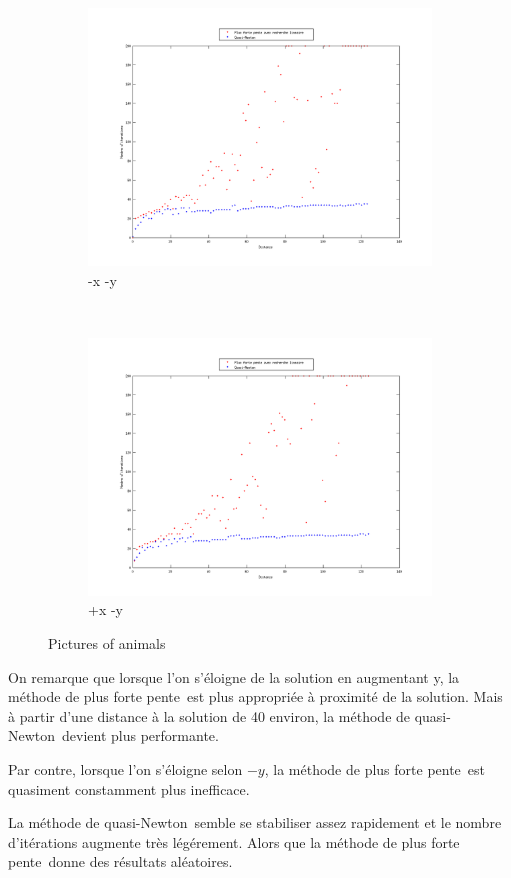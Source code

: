 \documentclass[11pt,a4paper,twoside,onecolumn,titlepage]{report}
\newcommand{\qn}{quasi-Newton}
\newcommand{\pfp}{plus forte pente}
\begin{document}
\begin{enumerate}[(a)]
\begin{figure}[h!]
	\begin{subfigure}[t]{0.5\textwidth}
		\centering
		\includegraphics[scale=0.4]{methods-quarter-1}
		\caption{-x -y}
		\label{fig:awesome_image}
	\end{subfigure}%
        ~ %
    \begin{subfigure}[t]{0.5\textwidth}
		\centering
		\includegraphics[scale=0.4]{methods-quarter-2}
		\caption{+x -y}
		\label{fig:awesome_image}
	\end{subfigure}
    \caption{Pictures of animals}\label{fig:methods-4}
\end{figure}


On remarque que lorsque l'on s'éloigne de la solution en augmentant y, la méthode de \pfp\ est plus appropriée à proximité de la solution. Mais à partir d'une distance à la solution de 40 environ, la méthode de \qn\ devient plus performante.

Par contre, lorsque l'on s'éloigne selon $-y$, la méthode de \pfp\ est quasiment constamment plus inefficace.

La méthode de \qn\ semble se stabiliser assez rapidement et le nombre d'itérations augmente très légérement. Alors que la méthode de \pfp\ donne des résultats aléatoires.


\end{enumerate}
\end{document}
